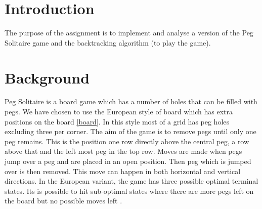 \documentclass[a4paper]{article}
\begin{document}
\begin{titlepage}

 

\vfill %

\end{titlepage}

\clearpage
\setcounter{page}{1}



\section{Introduction}
The purpose of the assignment is to implement and analyse a version of the Peg Solitaire game and the backtracking algorithm (to play the game).

\section{Background}
Peg Solitaire is a board game which has a number of holes that can be filled with pegs. We have chosen to use the European style of board which has extra positions on the board \ref{board}. In this style most of a grid has peg holes excluding three per corner. The aim of the game is to remove pegs until only one peg remains. This is the position one row directly above the central peg, a row above that and the left most peg in the top row. Moves are made when pegs jump over a peg and are placed in an open position. Then peg which is jumped over is then removed. This move can happen in both horizontal and vertical directions. In the European variant, the game has three possible optimal terminal states. Its is possible to hit sub-optimal states where there are more pegs left on the board but no possible moves left \cite{harder}. 
\end{document}
